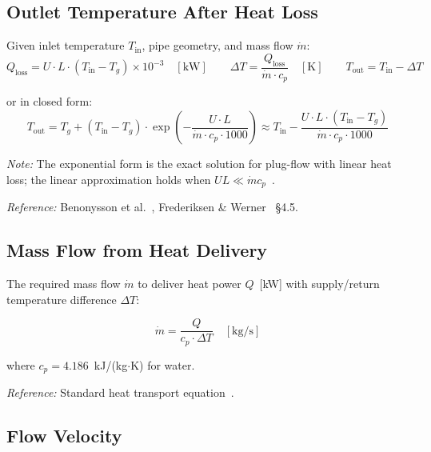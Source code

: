 \documentclass[a4paper,12pt]{article}
\begin{document}
\subsection{Outlet Temperature After Heat Loss}

Given inlet temperature $T_{\text{in}}$, pipe geometry, and mass flow $\dot{m}$:
\[
  Q_{\text{loss}} = U \cdot L \cdot (T_{\text{in}} - T_g) \times 10^{-3} \quad [\text{kW}]
  \qquad
  \Delta T = \frac{Q_{\text{loss}}}{\dot{m} \cdot c_p} \quad [\text{K}]
  \qquad
  T_{\text{out}} = T_{\text{in}} - \Delta T
  \tag{PH-2}
  \label{eq:ph2}
\]

or in closed form:
\begin{equation}
  T_{\text{out}}
  = T_g + (T_{\text{in}} - T_g)
    \cdot \exp\!\left(-\frac{U \cdot L}{\dot{m} \cdot c_p \cdot 1000}\right)
  \approx
  T_{\text{in}} - \frac{U \cdot L \cdot (T_{\text{in}} - T_g)}{\dot{m} \cdot c_p \cdot 1000}
  \label{eq:ph2-closed}
\end{equation}

\noindent\textit{Note:} The exponential form is the exact solution for plug-flow with linear
heat loss; the linear approximation holds when $UL \ll \dot{m} c_p$~\cite{Benonysson1995}.

\noindent\textit{Reference:} Benonysson et al.~\cite{Benonysson1995}, Frederiksen \&
Werner~\cite{Frederiksen2013} \S4.5.

\subsection{Mass Flow from Heat Delivery}

The required mass flow $\dot{m}$ to deliver heat power $Q$~[kW] with supply/return
temperature difference $\Delta T$:

\begin{equation}
  \dot{m} = \frac{Q}{c_p \cdot \Delta T}
  \quad [\text{kg/s}]
  \tag{PH-3}
  \label{eq:ph3}
\end{equation}

where $c_p = 4.186$~kJ/(kg$\cdot$K) for water.

\noindent\textit{Reference:} Standard heat transport equation~\cite{Frederiksen2013}.

\subsection{Flow Velocity}
\end{document}
